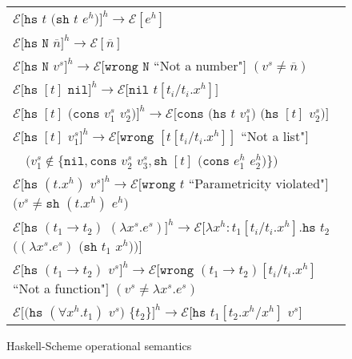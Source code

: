 \begin{figure}[p]
\centering
\begin{tabular}{l}

$\mathscr{E}[\mathtt{hs}$ $t$ $(\mathtt{sh}$ $t$ $e^h)]^h\rightarrow\mathscr{E}[e^h]$ \\

$\mathscr{E}[\mathtt{hs}$ $\mathtt{N}$ $\overline{n}]^h\rightarrow\mathscr{E}[\overline{n}]$ \\

$\mathscr{E}[\mathtt{hs}$ $\mathtt{N}$ $v^s]^h\rightarrow\mathscr{E}[\mathtt{wrong}$ $\mathtt{N}$ ``Not a number"$]$ $(v^s\neq\overline{n})$ \\

$\mathscr{E}[\mathtt{hs}$ $[t]$ $\mathtt{nil}]^h\rightarrow\mathscr{E}[\mathtt{nil}$ $t[t_i/t_i.x^h]]$ \\

$\mathscr{E}[\mathtt{hs}$ $[t]$ $(\mathtt{cons}$ $v^s_1$ $v^s_2)]^h\rightarrow\mathscr{E}[\mathtt{cons}$ $(\mathtt{hs}$ $t$ $v^s_1)$ $(\mathtt{hs}$ $[t]$ $v^s_2)]$ \\

$\mathscr{E}[\mathtt{hs}$ $[t]$ $v^s_1]^h\rightarrow\mathscr{E}[\mathtt{wrong}$ $[t[t_i/t_i.x^h]]$ ``Not a list"$]$ \\

$\quad(v^s_1\not\in\lbrace\mathtt{nil},\mathtt{cons}$ $v^s_2$ $v^s_3,\mathtt{sh}$ $[t]$ $(\mathtt{cons}$ $e^h_1$ $e^h_2)\rbrace)$ \\

$\mathscr{E}[\mathtt{hs}$ $(t.x^h)$ $v^s]^h\rightarrow\mathscr{E}[\mathtt{wrong}$ $t$ ``Parametricity violated"$]$ $(v^s\neq \mathtt{sh}$ $(t.x^h)$ $e^h)$ \\

$\mathscr{E}[\mathtt{hs}$ $(t_1\rightarrow t_2)$ $(\lambda x^s.e^s)]^h\rightarrow\mathscr{E}[\lambda x^h:t_1[t_i/t_i.x^h].\mathtt{hs}$ $t_2$ $((\lambda x^s.e^s)$ $(\mathtt{sh}$ $t_1$ $x^h))]$ \\

$\mathscr{E}[\mathtt{hs}$ $(t_1\rightarrow t_2)$ $v^s]^h\rightarrow\mathscr{E}[\mathtt{wrong}$ $(t_1\rightarrow t_2)[t_i/t_i.x^h]$ ``Not a function"$]$ $(v^s\neq\lambda x^s.e^s)$ \\

$\mathscr{E}[(\mathtt{hs}$ $(\forall x^h.t_1)$ $v^s)$ $\lbrace t_2\rbrace]^h\rightarrow\mathscr{E}[\mathtt{hs}$ $t_1[t_2.x^h/x^h]$ $v^s]$

\end{tabular}
\caption{Haskell-Scheme operational semantics}
\label{hsos}
\end{figure}